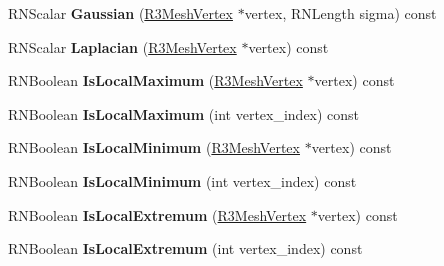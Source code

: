 \begin{DoxyCompactItemize}
\item 
R\+N\+Scalar {\bfseries Gaussian} (\hyperlink{class_r3_mesh_vertex}{R3\+Mesh\+Vertex} $\ast$vertex, R\+N\+Length sigma) const \hypertarget{struct_r3_mesh_property_a2bfe4d2fa651d4236e867bf6c362aaa0}{}\label{struct_r3_mesh_property_a2bfe4d2fa651d4236e867bf6c362aaa0}

\item 
R\+N\+Scalar {\bfseries Laplacian} (\hyperlink{class_r3_mesh_vertex}{R3\+Mesh\+Vertex} $\ast$vertex) const \hypertarget{struct_r3_mesh_property_a4592517d9e5fe5b7befe6716f945664d}{}\label{struct_r3_mesh_property_a4592517d9e5fe5b7befe6716f945664d}

\item 
R\+N\+Boolean {\bfseries Is\+Local\+Maximum} (\hyperlink{class_r3_mesh_vertex}{R3\+Mesh\+Vertex} $\ast$vertex) const \hypertarget{struct_r3_mesh_property_aec0ae79a46b8deff8a3aa35d32eedfbc}{}\label{struct_r3_mesh_property_aec0ae79a46b8deff8a3aa35d32eedfbc}

\item 
R\+N\+Boolean {\bfseries Is\+Local\+Maximum} (int vertex\+\_\+index) const \hypertarget{struct_r3_mesh_property_a5ec4368fec8b4d1dfaa0e3a85b39a14f}{}\label{struct_r3_mesh_property_a5ec4368fec8b4d1dfaa0e3a85b39a14f}

\item 
R\+N\+Boolean {\bfseries Is\+Local\+Minimum} (\hyperlink{class_r3_mesh_vertex}{R3\+Mesh\+Vertex} $\ast$vertex) const \hypertarget{struct_r3_mesh_property_a7bec29d7b3e41ef4f27ad7482690f9d0}{}\label{struct_r3_mesh_property_a7bec29d7b3e41ef4f27ad7482690f9d0}

\item 
R\+N\+Boolean {\bfseries Is\+Local\+Minimum} (int vertex\+\_\+index) const \hypertarget{struct_r3_mesh_property_aafff7dd8e59a319a2953d449921560ab}{}\label{struct_r3_mesh_property_aafff7dd8e59a319a2953d449921560ab}

\item 
R\+N\+Boolean {\bfseries Is\+Local\+Extremum} (\hyperlink{class_r3_mesh_vertex}{R3\+Mesh\+Vertex} $\ast$vertex) const \hypertarget{struct_r3_mesh_property_aa726b25f261c2be197a180c5f19392eb}{}\label{struct_r3_mesh_property_aa726b25f261c2be197a180c5f19392eb}

\item 
R\+N\+Boolean {\bfseries Is\+Local\+Extremum} (int vertex\+\_\+index) const \hypertarget{struct_r3_mesh_property_a4a0dd3c21254ce2a522ec912870aa763}{}\label{struct_r3_mesh_property_a4a0dd3c21254ce2a522ec912870aa763}


\end{DoxyCompactItemize}
